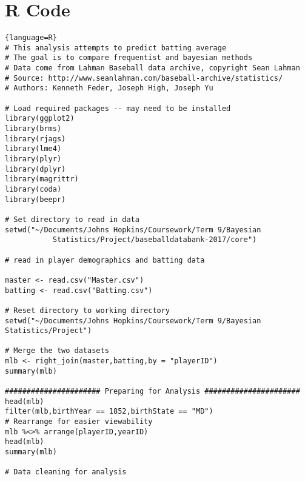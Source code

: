 \documentclass[10pt,a4paper]{article}
\begin{document}
\section*{R Code}
\begin{lstlisting}{language=R}
# This analysis attempts to predict batting average
# The goal is to compare frequentist and bayesian methods
# Data come from Lahman Baseball data archive, copyright Sean Lahman
# Source: http://www.seanlahman.com/baseball-archive/statistics/
# Authors: Kenneth Feder, Joseph High, Joseph Yu

# Load required packages -- may need to be installed
library(ggplot2)
library(brms)
library(rjags)
library(lme4)
library(plyr)
library(dplyr) 
library(magrittr)
library(coda)
library(beepr)

# Set directory to read in data
setwd("~/Documents/Johns Hopkins/Coursework/Term 9/Bayesian 
           Statistics/Project/baseballdatabank-2017/core") 

# read in player demographics and batting data

master <- read.csv("Master.csv")
batting <- read.csv("Batting.csv")

# Reset directory to working directory
setwd("~/Documents/Johns Hopkins/Coursework/Term 9/Bayesian 
Statistics/Project")

# Merge the two datasets
mlb <- right_join(master,batting,by = "playerID")
summary(mlb)

###################### Preparing for Analysis ######################
head(mlb)
filter(mlb,birthYear == 1852,birthState == "MD")
# Rearrange for easier viewability
mlb %<>% arrange(playerID,yearID)
head(mlb)
summary(mlb)

# Data cleaning for analysis


\end{lstlisting}
\end{document}
